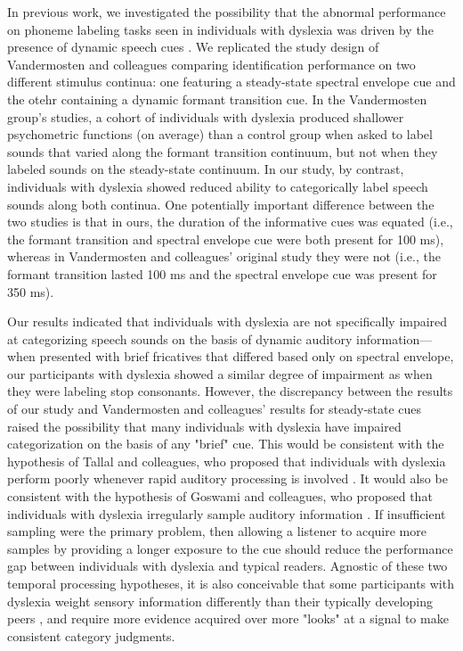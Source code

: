 \documentclass[../uwthesis.tex]{subfiles}
\begin{document}
In previous work, we investigated the possibility that the abnormal performance on phoneme labeling tasks seen in individuals with dyslexia was driven by the presence of dynamic speech cues \cite{OBrien2018ReadingCategorization}. We replicated the study design of Vandermosten and colleagues \cite{Vandermosten2010AdultsCues,Vandermosten2011ImpairmentsDifficulties} comparing identification performance on two different stimulus continua: one featuring a steady-state spectral envelope cue and the otehr containing a dynamic formant transition cue. In the Vandermosten group's studies, a cohort of individuals with dyslexia produced shallower psychometric functions (on average) than a control group when asked to label sounds that varied along the formant transition continuum, but not when they labeled sounds on the steady-state continuum. In our study, by contrast, individuals with dyslexia showed reduced ability to categorically label speech sounds along both continua. One potentially important difference between the two studies is that in ours, the duration of the informative cues was equated (i.e., the formant transition and spectral envelope cue were both present for 100 ms), whereas in Vandermosten and colleagues' original study they were not (i.e., the formant transition lasted 100 ms and the spectral envelope cue was present for 350 ms).

Our results indicated that individuals with dyslexia are not specifically impaired at categorizing speech sounds on the basis of dynamic auditory information---when presented with brief fricatives that differed based only on spectral envelope, our participants with dyslexia showed a similar degree of impairment as when they were labeling stop consonants. However, the discrepancy between the results of our study and Vandermosten and colleagues' results for steady-state cues raised the possibility that many individuals with dyslexia have impaired categorization on the basis of any "brief" cue. This would be consistent with the hypothesis of Tallal and colleagues, who proposed that individuals with dyslexia perform poorly whenever rapid auditory processing is involved \cite{Merzenich1996TemporalTraining,Tallal1996LanguageSpeech}. It would also be consistent with the hypothesis of Goswami and colleagues, who proposed that individuals with dyslexia irregularly sample auditory information \cite{Goswami2011ADyslexia}. If insufficient sampling were the primary problem, then allowing a listener to acquire more samples by providing a longer exposure to the cue should reduce the performance gap between individuals with dyslexia and typical readers. Agnostic of these two temporal processing hypotheses, it is also conceivable that some participants with dyslexia weight sensory information differently than their typically developing peers \cite{Nittrouer1999DoProblems}, and require more evidence acquired over more "looks" at a signal to make consistent category judgments.
\end{document}

